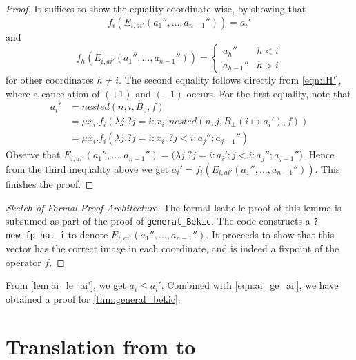\begin{proof}
    It suffices to show the equality coordinate-wise, by showing that
    \[f_i(E_{i,ai'}(a_1'',\dots,a_{n-1}'')) = a_i'\] and 
    \begin{equation*}
        f_h(E_{i,ai'}(a_1'',\dots,a_{n-1}'')) = \begin{cases}
            a_h'' & h<i \\
            a_{h-1}'' & h> i
        \end{cases}
    \end{equation*} 
    for other coordinates $h\neq i$.
    The second equality follows directly from \autoref{eqn:IH'}, where a cancelation of $(+1)$ and $(-1)$ occurs. For the first equality, note that 
    \begin{align*}
        a_i' &= nested(n,i,B_0,f) \\
             &= \mu x_i. f_i(\lambda j. ?j=i:x_i; nested(n, j, B_\bot(i\mapsto a_i'), f)) \\
             &= \mu x_i. f_i(\lambda j. ?j=i:x_i; ?j<i: a_j''; a_{j-1}'')
    \end{align*}
    Observe that $E_{i,ai'}(a_1'',\dots,a_{n-1}'') = (\lambda j. ?j=i:a_i';j<i: a_j''; a_{j-1}''$). Hence from the third inequality above we get $a_i' = f_i(E_{i,ai'}(a_1'',\dots,a_{n-1}''))$. This finishes the proof.
\end{proof}

\begin{proof}[Sketch of Formal Proof Architecture]
    The formal Isabelle proof of this lemma is subsumed as part of the proof of \texttt{general\_Bekic}. The code constructs a \texttt{?new\_fp\_hat\_i} to denote $E_{i,ai'}(a_1'',\dots,a_{n-1}'')$. It proceeds to show that this vector has the correct image in each coordinate, and is indeed a fixpoint of the operator $f$.
\end{proof}

From \autoref{lem:ai_le_ai'}, we get $a_i\leq a_i'$. Combined with \autoref{eqn:ai_ge_ai'}, we have obtained a proof for \autoref{thm:general_bekic}.

\section{Translation from \texorpdfstring{\GLs{}}{} to \rlGL{}}
\label{sec:trans_GLs_rlGL}

